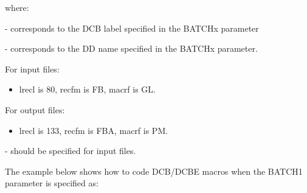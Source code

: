 \documentclass[letterpaper,10pt,english]{sphinxmanual}
\begin{document}
where:

 - corresponds to the DCB label specified in the BATCHx parameter

 - corresponds to the DD name specified in the BATCHx parameter.

For input files:
\begin{itemize}
\item {} 
lrecl is 80, recfm is FB, macrf is GL.

\end{itemize}

For output files:
\begin{itemize}
\item {} 
lrecl is 133, recfm is FBA, macrf is PM.

\end{itemize}

 - should be specified for input files.

The example below shows how to code DCB/DCBE macros when the BATCH1 parameter is specified as:

\begin{sphinxVerbatim}[commandchars=\\\{\}]

                             
                                                    
                                                       
                                                       
                                                       
         
                               
                                                    
                                                      
                                                       
                                                      
        
\end{sphinxVerbatim}
\end{document}
